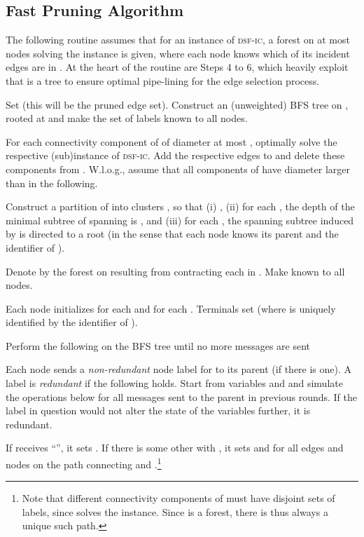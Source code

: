 \documentclass[letterpaper,11pt]{article}
\newcommand{\sfic}{\textsc{dsf-ic}\xspace}
\begin{document}
\subsection{Fast Pruning Algorithm}
\label{app:prune}
The following routine assumes that for an instance of \sfic, a forest  on at
most  nodes solving the instance is given, where each
node knows which of its incident edges are in . At the heart of the routine
are Steps 4 to 6, which heavily exploit that  is a tree to ensure optimal
pipe-lining for the edge selection process.
\begin{compactenum}
\item Set  (this will be the pruned edge set). Construct an
(unweighted) BFS tree on , rooted at  and make the set of labels 
known to all nodes.
\item For each connectivity component of  of diameter at most ,
optimally solve the respective (sub)instance of \sfic. Add the respective edges
to  and delete these components from . W.l.o.g., assume that all
components of  have diameter larger than  in the following.
\item Construct a partition of  into clusters , so that
(i) , (ii) for each , the depth of the
minimal subtree of  spanning  is , and (iii) for each , the spanning subtree induced by  is directed to a root 
(in the sense that each node knows its parent and the identifier of ).
\item Denote by  the
forest on  resulting from contracting each  in .
Make  known to all nodes.
\item Each node  initializes for each 
 and for each  . Terminals
 set  (where  is uniquely identified by the
identifier of ).
\item Perform the following on the BFS tree until no more messages are sent
\begin{compactitem}
\item Each node  sends a \emph{non-redundant} node label  for
 to its parent (if there is one). A label is \emph{redundant}
if the following holds. Start from variables  and
 and simulate the operations below for all messages
sent to the parent in previous rounds. If the label in question would not alter
the state of the variables further, it is redundant.
\item If  receives ``'', it sets
. If there is some other  with 
, it sets  and
 for all edges  and nodes  on the
path connecting  and .\footnote{Note that different connectivity
components of  must have disjoint sets of labels, since  solves the
instance. Since  is a forest, there is thus always a unique such path.}

\end{compactitem}
\end{compactenum}
\end{document}
